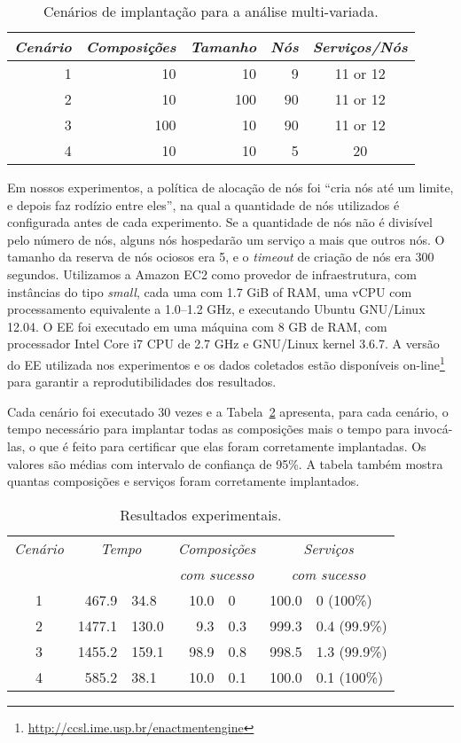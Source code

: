 \begin{table}
\centering
\caption{Cenários de implantação para a análise multi-variada.}
\label{tab:cases}
\begin{tabular}{r r r r c} \hline
\emph{Cenário} & \emph{Composições} & \emph{Tamanho} & \emph{Nós} & \emph{Serviços/Nós} \\ \hline
1 &  10 &  10 &  9 & 11 or 12 \\
2 &  10 & 100 & 90 & 11 or 12 \\
3 & 100 &  10 & 90 & 11 or 12 \\
4 &  10 &  10 &  5 &       20 \\
\hline \end{tabular}
\end{table}

Em nossos experimentos, a política de alocação de nós foi ``cria nós até um limite, e depois faz rodízio entre eles'',
na qual a quantidade de nós utilizados é configurada antes de cada experimento.
Se a quantidade de nós não é divisível pelo número de nós,
alguns nós hospedarão um serviço a mais que outros nós.
O tamanho da reserva de nós ociosos era 5,
e o \emph{timeout} de criação de nós era 300 segundos.
Utilizamos a Amazon EC2 como provedor de infraestrutura,
com instâncias do tipo \emph{small},
cada uma com 1.7 GiB of RAM, uma vCPU com processamento
equivalente a 1.0--1.2 GHz, e executando Ubuntu GNU/Linux 12.04.
O EE foi executado em uma máquina com 8 GB de RAM,
com processador Intel Core i7 CPU de 2.7 GHz e GNU/Linux kernel 3.6.7.
A versão do EE utilizada nos experimentos e os dados coletados estão disponíveis 
on-line\footnote{\url{http://ccsl.ime.usp.br/enactmentengine}}
para garantir a reprodutibilidades dos resultados.

Cada cenário foi executado 30 vezes e a Tabela~\ref{tab:results}
apresenta, para cada cenário, o tempo necessário para implantar
todas as composições mais o tempo para invocá-las, o que é feito
para certificar que elas foram corretamente implantadas.
Os valores são médias com intervalo de confiança de 95\%.
A tabela também mostra quantas composições e serviços foram corretamente implantados.

\begin{table}
\centering
\caption{Resultados experimentais.}
\label{tab:results}
\begin{tabular}{c r@{ $\pm$ }l r@{ $\pm$ }l r@{ $\pm$ }l} \hline

\emph{Cenário} & \multicolumn{2}{c}{\emph{Tempo}} & \multicolumn{2}{c}{\emph{Composições}}   & \multicolumn{2}{c}{\emph{Serviços}}\\
                 & \multicolumn{2}{c}{}           & \multicolumn{2}{c}{\emph{com sucesso}} & \multicolumn{2}{c}{\emph{com sucesso}}\\
\hline
1 &  467.9 &  34.8 & 10.0 & 0   & 100.0 & 0   (100\%) \\
2 & 1477.1 & 130.0 &  9.3 & 0.3 & 999.3 & 0.4 (99.9\%)\\
3 & 1455.2 & 159.1 & 98.9 & 0.8 & 998.5 & 1.3 (99.9\%)\\
4 &  585.2 &  38.1 & 10.0 & 0.1 & 100.0 & 0.1 (100\%)\\
\hline \end{tabular}
\end{table}

